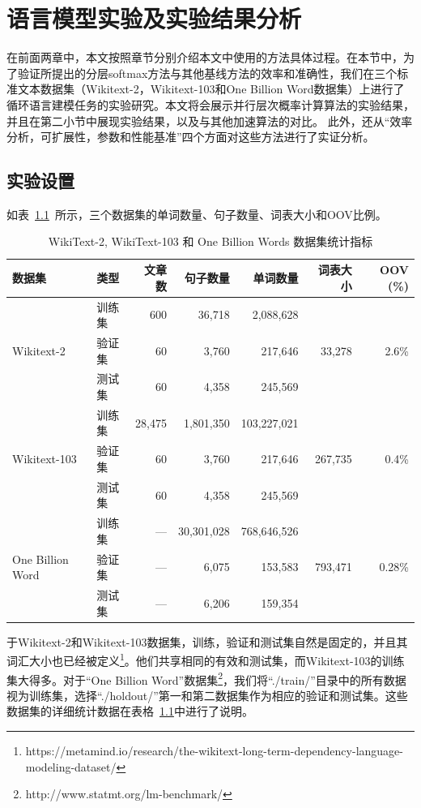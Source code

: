 
\chapter{语言模型实验及实验结果分析}
在前面两章中，本文按照章节分别介绍本文中使用的方法具体过程。在本节中，为了验证所提出的分层softmax方法与其他基线方法的效率和准确性，我们在三个标准文本数据集（Wikitext-2，Wikitext-103和One Billion Word数据集）上进行了循环语言建模任务的实验研究。本文将会展示并行层次概率计算算法的实验结果，并且在第二小节中展现实验结果，以及与其他加速算法的对比。 此外，还从“效率分析，可扩展性，参数和性能基准”四个方面对这些方法进行了实证分析。

\section{实验设置}
如表~\ref{tab:dataset}~所示，三个数据集的单词数量、句子数量、词表大小和OOV比例。
\begin{table}
  \centering
  \caption{WikiText-2, WikiText-103 和 One Billion Words 数据集统计指标 \label{tab:dataset}}
\begin{tabular}{llrrrrr}
\toprule
数据集& 类型& 文章数 & 句子数量 &  单词数量 &词表大小 & OOV (\%) \\ \midrule
\multirow{3}{*}{Wikitext-2} &训练集& 600 & 36,718 & 2,088,628 & \multirow{3}{*}{33,278} & \multirow{3}{*}{2.6\%} \\
&验证集& 60 &3,760 & 217,646  & &\\
&测试集& 60 & 4,358 & 245,569 & &\\
\midrule
\multirow{3}{*}{Wikitext-103} &训练集& 28,475 &  1,801,350 &  103,227,021 & \multirow{3}{*}{267,735} & \multirow{3}{*}{0.4\%} \\
&验证集& 60 &3,760 & 217,646  & &\\
&测试集& 60 & 4,358 & 245,569 & &\\
\midrule
\multirow{3}{*}{One Billion Word} &训练集& --- &30,301,028&768,646,526&   \multirow{3}{*}{793,471} &   \multirow{3}{*}{0.28\%} \\
 &验证集& --- &  6,075 &   153,583 &&\\
 &测试集 & --- &  6,206 &   159,354 &&\\
\bottomrule
\end{tabular}
\end{table}
于Wikitext-2和Wikitext-103数据集，训练，验证和测试集自然是固定的，并且其词汇大小也已经被定义\footnote{https://metamind.io/research/the-wikitext-long-term-dependency-language-modeling-dataset/}。他们共享相同的有效和测试集，而Wikitext-103的训练集大得多。对于``One Billion Word''数据集\footnote{http://www.statmt.org/lm-benchmark/}，我们将``./train/''目录中的所有数据视为训练集，选择``./holdout/''第一和第二数据集作为相应的验证和测试集。这些数据集的详细统计数据在表格~\ref{tab:dataset}中进行了说明。


